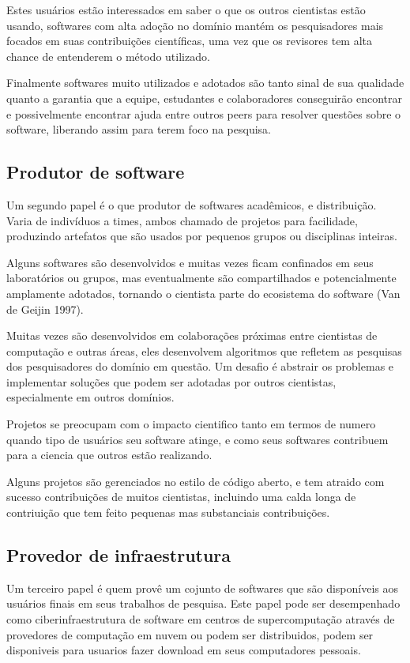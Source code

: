 Estes usuários estão interessados em saber o que os outros cientistas estão
usando, softwares com alta adoção no domínio mantém os pesquisadores mais
focados em suas contribuições científicas, uma vez que os revisores tem alta
chance de entenderem o método utilizado.

Finalmente softwares muito utilizados e adotados são tanto sinal de sua qualidade
quanto a garantia que a equipe, estudantes e colaboradores conseguirão encontrar
e possivelmente encontrar ajuda entre outros peers para resolver questões sobre o
software, liberando assim para terem foco na pesquisa.

\subsection{Produtor de software}

Um segundo papel é o que produtor de softwares acadêmicos, e distribuição. Varia
de indivíduos a times, ambos chamado de projetos para facilidade, produzindo
artefatos que são usados por pequenos grupos ou disciplinas inteiras.

Alguns softwares são desenvolvidos e muitas vezes ficam confinados em seus laboratórios
ou grupos, mas eventualmente são compartilhados e potencialmente amplamente adotados, tornando
o cientista parte do ecosistema do software (Van de Geijin 1997).

Muitas vezes são desenvolvidos em colaborações próximas entre cientistas de computação e
outras áreas, eles desenvolvem algoritmos que refletem as pesquisas dos pesquisadores
do domínio em questão. Um desafio é abstrair os problemas e implementar soluções que
podem ser adotadas por outros cientistas, especialmente em outros domínios.

Projetos se preocupam com o impacto cientifico tanto em termos de numero quando
tipo de usuários seu software atinge, e como seus softwares contribuem para a
ciencia que outros estão realizando.

Alguns projetos são gerenciados no estilo de código aberto, e tem
atraido com sucesso contribuições de muitos cientistas, incluindo
uma calda longa de contriuição que tem feito pequenas mas substanciais
contribuições.

\subsection{Provedor de infraestrutura}

Um terceiro papel é quem provê um cojunto de softwares que são
disponíveis aos usuários finais em seus trabalhos de pesquisa.
Este papel pode ser desempenhado como ciberinfraestrutura de software
em centros de supercomputação através de provedores de computação
em nuvem ou podem ser distribuidos, podem ser disponiveis para usuarios
fazer download em seus computadores pessoais.

